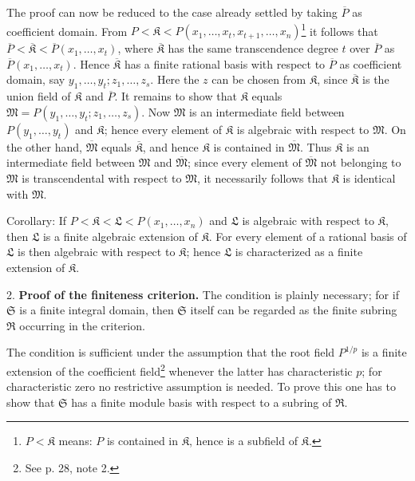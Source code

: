 \documentclass[11pt]{article}
\begin{document}
The proof can now be reduced to the case already settled by taking $\overline P$ as coefficient domain. From $P<\mathfrak K<P(x_1,\ldots,x_t,x_{t+1},\ldots,x_n)$\footnote{$P<\mathfrak K$ means: $P$ is contained in $\mathfrak K$, hence is a subfield of $\mathfrak K$.} it follows that $\overline P<\overline{\mathfrak K}<\overline P(x_1,\ldots,x_t)$, where $\overline{\mathfrak K}$ has the same transcendence degree $t$ over $\overline P$ as $\overline P(x_1,\ldots,x_t)$. Hence $\overline{\mathfrak K}$ has a finite rational basis with respect to $\overline P$ as coefficient domain, say $y_1,\ldots,y_t; z_1,\ldots,z_s$. Here the $z$ can be chosen from $\mathfrak K$, since $\overline{\mathfrak K}$ is the union field of $\mathfrak K$ and $\overline P$. It remains to show that $\mathfrak K$ equals $\mathfrak M=P(y_1,\ldots,y_t;z_1,\ldots,z_s)$. Now $\mathfrak M$ is an intermediate field between $P(y_1,\ldots,y_t)$ and $\mathfrak K$; hence every element of $\mathfrak K$ is algebraic with respect to $\mathfrak M$. On the other hand, $\overline{\mathfrak M}$ equals $\overline{\mathfrak K}$, and hence $\mathfrak K$ is contained in $\overline{\mathfrak M}$. Thus $\mathfrak K$ is an intermediate field between $\mathfrak M$ and $\overline{\mathfrak M}$; since every element of $\overline{\mathfrak M}$ not belonging to $\mathfrak M$ is transcendental with respect to $\mathfrak M$, it necessarily follows that $\mathfrak K$ is identical with $\mathfrak M$.

Corollary: If $P<\mathfrak K<\mathfrak L<P(x_1,\ldots,x_n)$ and $\mathfrak L$ is algebraic with respect to $\mathfrak K$, then $\mathfrak L$ is a finite algebraic extension of $\mathfrak K$. For every element of a rational basis of $\mathfrak L$ is then algebraic with respect to $\mathfrak K$; hence $\mathfrak L$ is characterized as a finite extension of $\mathfrak K$.

2. \textbf{Proof of the finiteness criterion.} The condition is plainly necessary; for if $\mathfrak S$ is a finite integral domain, then $\mathfrak S$ itself can be regarded as the finite subring $\mathfrak R$ occurring in the criterion.

The condition is sufficient under the assumption that the root field $P^{1/p}$ is a finite extension of the coefficient field\footnote{See p. 28, note 2.} whenever the latter has characteristic $p$; for characteristic zero no restrictive assumption is needed. To prove this one has to show that $\mathfrak S$ has a finite module basis with respect to a subring of $\mathfrak R$.
\end{document}

